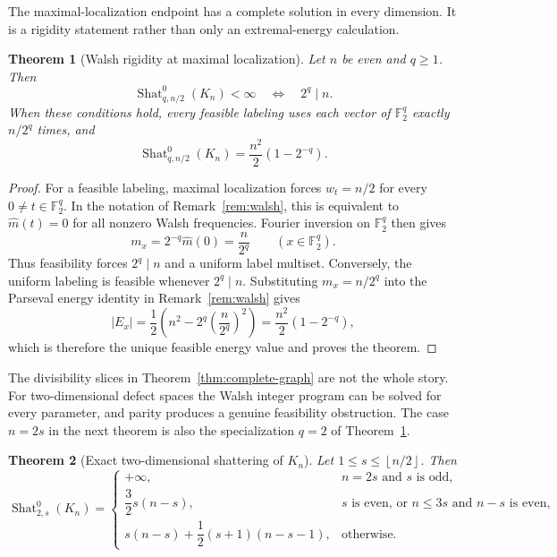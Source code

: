 \documentclass[11pt,letterpaper]{article}
\theoremstyle{plain}
\newtheorem{theorem}{Theorem}[section]
\theoremstyle{definition}
\newcommand{\F}{\mathbb{F}_2}
\newcommand{\Shat}{\operatorname{Shat}}
\newcommand{\1}{\mathbf{1}}
\newcommand{\abs}[1]{\left|#1\right|}
\newcommand{\floor}[1]{\left\lfloor#1\right\rfloor}
\begin{document}
The maximal-localization endpoint has a complete solution in every dimension.  It is a
rigidity statement rather than only an extremal-energy calculation.

\begin{theorem}[Walsh rigidity at maximal localization]
\label{thm:complete-graph-maximal}
Let $n$ be even and $q\ge1$.  Then
\begin{equation}\label{eq:complete-maximal}
 \Shat_{q,n/2}^0(K_n)<\infty
 \quad\Longleftrightarrow\quad
 2^q\mid n.
\end{equation}
When these conditions hold, every feasible labeling uses each vector of $\F^q$ exactly
$n/2^q$ times, and
\begin{equation}\label{eq:complete-maximal-value}
 \Shat_{q,n/2}^0(K_n)
 =\frac{n^2}{2}\left(1-2^{-q}\right).
\end{equation}
\end{theorem}

\begin{proof}
For a feasible labeling, maximal localization forces
$w_t=n/2$ for every $0\ne t\in\F^q$.  In the notation of
Remark~\ref{rem:walsh}, this is equivalent to
$\widehat m(t)=0$ for all nonzero Walsh frequencies.  Fourier inversion on $\F^q$ then
gives
\[
 m_x=2^{-q}\widehat m(0)=\frac{n}{2^q}
 \qquad(x\in\F^q).
\]
Thus feasibility forces $2^q\mid n$ and a uniform label multiset.  Conversely, the
uniform labeling is feasible whenever $2^q\mid n$.  Substituting
$m_x=n/2^q$ into the Parseval energy identity in Remark~\ref{rem:walsh} gives
\[
 \abs{E_x}
 =\frac12\left(n^2-2^q\left(\frac{n}{2^q}\right)^2\right)
 =\frac{n^2}{2}\left(1-2^{-q}\right),
\]
which is therefore the unique feasible energy value and proves the theorem.
\end{proof}

The divisibility slices in Theorem~\ref{thm:complete-graph} are not the whole story.
For two-dimensional defect spaces the Walsh integer program can be solved for every
parameter, and parity produces a genuine feasibility obstruction.  The case $n=2s$ in
the next theorem is also the specialization $q=2$ of
Theorem~\ref{thm:complete-graph-maximal}.

\begin{theorem}[Exact two-dimensional shattering of $K_n$]
\label{thm:complete-graph-q2}
Let $1\le s\le\floor{n/2}$.  Then
\begin{equation}\label{eq:complete-q2}
 \Shat_{2,s}^0(K_n)=
 \begin{cases}
 +\infty,
   & n=2s\text{ and }s\text{ is odd},\\[1mm]
 \dfrac32s(n-s),
   & s\text{ is even, or }n\le3s\text{ and }n-s\text{ is even},\\[2mm]
 s(n-s)+\dfrac12(s+1)(n-s-1),
   & \text{otherwise}.
 \end{cases}
\end{equation}
\end{theorem}
\end{document}
